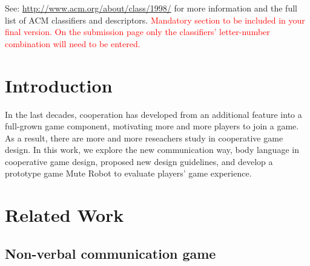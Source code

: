 \documentclass{sigchi}
\begin{document}

See: \url{http://www.acm.org/about/class/1998/}
for more information and the full list of ACM classifiers
and descriptors. 
\textcolor{red}{Mandatory section to be included in your
final version. On the submission page only the classifiers'
letter-number combination will need to be entered.}

\section{Introduction}

In the last decades, cooperation has developed from an additional feature into a full-grown game component, motivating more and more players to join a game. As a result, there are more and more reseachers study in cooperative game design. In this work, we explore the new communication way, body language in cooperative game design,  proposed new design guidelines, and develop a prototype game Mute Robot to evaluate players’ game experience.


\section{Related Work}

\subsection{Non-verbal communication game}
\end{document}
